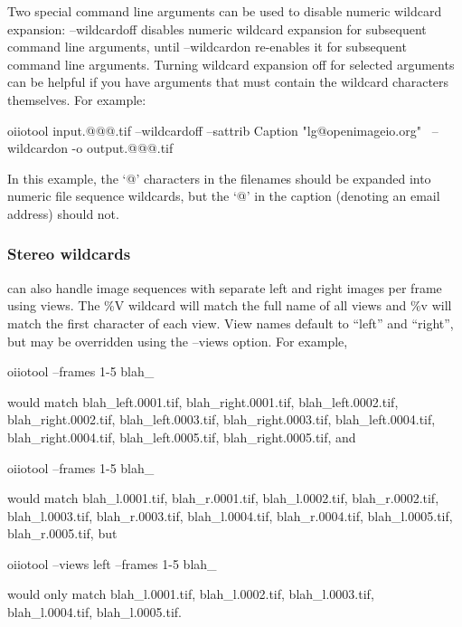 Two special command line arguments can be used to disable numeric wildcard
expansion: {\cf --wildcardoff} disables numeric wildcard expansion for
subsequent command line arguments, until {\cf --wildcardon} re-enables
it for subsequent command line arguments. Turning wildcard expansion off
for selected arguments can be helpful if you have arguments that must 
contain the wildcard characters themselves. For example:

\begin{code}
    oiiotool input.@@@.tif --wildcardoff --sattrib Caption "lg@openimageio.org" \
        --wildcardon -o output.@@@.tif
\end{code}

\noindent In this example, the `{\cf @}' characters in the filenames should
be expanded into numeric file sequence wildcards, but the `{\cf @}' in the
caption (denoting an email address) should not.

\subsubsection*{Stereo wildcards}

\oiiotool can also handle image sequences with separate left and right
images per frame using {\cf views}. The {\cf \%V} wildcard will match
the full name of all views and {\cf \%v} will match the first character
of each view. View names default to ``left'' and ``right'', but may
be overridden using the {\cf --views} option.
For example,
\begin{code}
    oiiotool --frames 1-5 blah_%
\end{code}
\noindent would match {\cf blah_left.0001.tif}, {\cf blah_right.0001.tif},
{\cf blah_left.0002.tif}, {\cf blah_right.0002.tif}, {\cf blah_left.0003.tif},
{\cf blah_right.0003.tif}, {\cf blah_left.0004.tif}, 
{\cf blah_right.0004.tif}, {\cf blah_left.0005.tif}, 
{\cf blah_right.0005.tif}, and
\begin{code}
    oiiotool --frames 1-5 blah_%
\end{code}
\noindent would match {\cf blah_l.0001.tif}, {\cf blah_r.0001.tif},
{\cf blah_l.0002.tif}, {\cf blah_r.0002.tif}, {\cf blah_l.0003.tif},
{\cf blah_r.0003.tif}, {\cf blah_l.0004.tif}, {\cf blah_r.0004.tif}, 
{\cf blah_l.0005.tif}, {\cf blah_r.0005.tif}, but
\begin{code}
    oiiotool --views left --frames 1-5 blah_%
\end{code}
\noindent would only match {\cf blah_l.0001.tif}, {\cf blah_l.0002.tif},
{\cf blah_l.0003.tif}, {\cf blah_l.0004.tif}, {\cf blah_l.0005.tif}.

